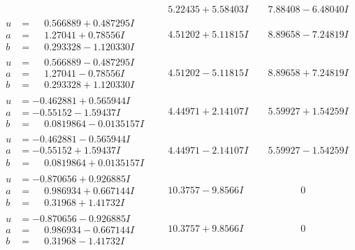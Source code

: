 \documentclass[1p]{elsarticle_modified}
\theoremstyle{definition}
\begin{document}
$$\begin{array}{c|c|c}
 & \phantom{-}5.22435 + 5.58403 I & \phantom{-}7.88408 - 6.48040 I \\ \hline\begin{aligned}
u &= \phantom{-}0.566889 + 0.487295 I \\
a &= \phantom{-}1.27041 + 0.78556 I \\
b &= \phantom{-}0.293328 - 1.120330 I\end{aligned}
 & \phantom{-}4.51202 + 5.11815 I & \phantom{-}8.89658 - 7.24819 I \\ \hline\begin{aligned}
u &= \phantom{-}0.566889 - 0.487295 I \\
a &= \phantom{-}1.27041 - 0.78556 I \\
b &= \phantom{-}0.293328 + 1.120330 I\end{aligned}
 & \phantom{-}4.51202 - 5.11815 I & \phantom{-}8.89658 + 7.24819 I \\ \hline\begin{aligned}
u &= -0.462881 + 0.565944 I \\
a &= -0.55152 - 1.59437 I \\
b &= \phantom{-}0.0819864 - 0.0135157 I\end{aligned}
 & \phantom{-}4.44971 + 2.14107 I & \phantom{-}5.59927 + 1.54259 I \\ \hline\begin{aligned}
u &= -0.462881 - 0.565944 I \\
a &= -0.55152 + 1.59437 I \\
b &= \phantom{-}0.0819864 + 0.0135157 I\end{aligned}
 & \phantom{-}4.44971 - 2.14107 I & \phantom{-}5.59927 - 1.54259 I \\ \hline\begin{aligned}
u &= -0.870656 + 0.926885 I \\
a &= \phantom{-}0.986934 + 0.667144 I \\
b &= \phantom{-}0.31968 + 1.41732 I\end{aligned}
 & \phantom{-}10.3757 - 9.8566 I & \phantom{-0.000000 } 0 \\ \hline\begin{aligned}
u &= -0.870656 - 0.926885 I \\
a &= \phantom{-}0.986934 - 0.667144 I \\
b &= \phantom{-}0.31968 - 1.41732 I\end{aligned}
 & \phantom{-}10.3757 + 9.8566 I & \phantom{-0.000000 } 0 \\ \hline\begin{aligned}

\end{aligned}
\end{array}$$
\end{document}
